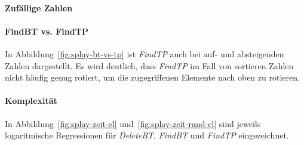 \paragraph{Zufällige Zahlen}

\paragraph{FindBT vs. FindTP}
In Abbildung~\ref{fig:splay-bt-vs-tp} ist \textit{FindTP} auch bei auf- und absteigenden Zahlen
dargestellt.
Es wird deutlich, dass \textit{FindTP} im Fall von sortieren Zahlen nicht häufig genug rotiert, um
die zugegriffenen Elemente nach oben zu rotieren.

\paragraph{Komplexität}
In Abbildung~\ref{fig:splay-zeit-el} und~\ref{fig:splay-zeit-rand-el} sind jeweils
logaritmische Regressionen für \textit{DeleteBT}, \textit{FindBT} und \textit{FindTP} eingezeichnet.



